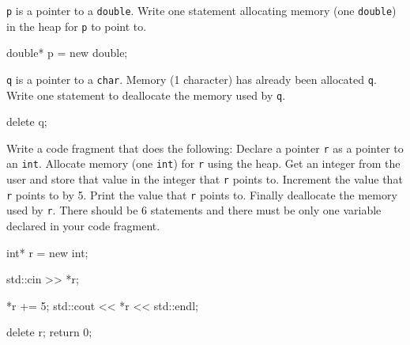 

\nextq
\verb!p! is a pointer to a \verb!double!.
Write one statement allocating memory (one \verb!double!) in the heap
for \verb!p! to point to.
\\ \ANSWER
\begin{answercode}
double* p = new double;
\end{answercode}

\nextq
\verb!q! is a pointer to a \verb!char!.
Memory (1 character) has already been allocated \verb!q!.
Write one statement to deallocate the memory used by \verb!q!.
\\ \ANSWER
\begin{answercode}
delete q;
\end{answercode}

\nextq
Write a code fragment that does the following:
Declare a pointer \verb!r! as a pointer to an \verb!int!.
Allocate memory (one \verb!int!) for \verb!r! using the heap.
Get an integer from the user and store that value in the integer
that \verb!r! points to.
Increment the value that \verb!r! points to by 5.
Print the value that \verb!r! points to.
Finally deallocate the memory used by \verb!r!.
There should be 6 statements and
there must be only one variable declared in your code fragment.
\\ \ANSWER
\begin{answercode}
  int* r = new int;

  std::cin >> *r; 

  *r += 5;
  std::cout << *r << std::endl;
  
  delete r;
  return 0;
\end{answercode}


